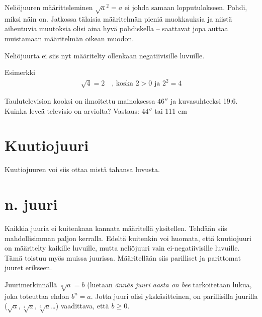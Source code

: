 Neliöjuuren määritteleminen $\sqrt{a}^2=a$ ei johda samaan lopputulokseen. Pohdi, miksi näin on.
Jatkossa tälaisia määritelmän pieniä muokkauksia ja niistä aiheutuvia muutoksia olisi aina hyvä pohdiskella -- saattavat jopa auttaa muistamaan määritelmän oikean muodon.


Neliöjuurta ei siis nyt määritelty ollenkaan negatiivisille luvuille.


Esimerkki
\begin{align*}
\sqrt{4} = 2 \quad \textrm{, koska $2>0$ ja $2^2 =4$} 
\end{align*}

Taulutelevision kooksi on ilmoitettu mainoksessa $46''$ ja kuvasuhteeksi 19:6. Kuinka leveä televisio on arviolta?
Vastaus: $44''$ tai 111 cm

\section{Kuutiojuuri}

Kuutiojuuren voi siis ottaa mistä tahansa luvusta.


\section{n. juuri}
Kaikkia juuria ei kuitenkaan kannata määritellä yksitellen. Tehdään siis mahdollisimman paljon kerralla. Edeltä kuitenkin voi huomata, että kuutiojuuri on määritelty kaikille luvuille, mutta neliöjuuri vain ei-negatiivisille luvuille. Tämä toistuu myös muissa juurissa. Määritellään siis parilliset ja parittomat juuret erikseen.

Juurimerkinnällä $\sqrt[n]{a}=b$ (luetaan \emph{ännäs juuri aasta on bee} tarkoitetaan lukua, joka toteuttaa ehdon $b^n = a$. Jotta juuri olisi ykskäsitteinen, on parillisilla juurilla ($\sqrt{a}, \sqrt[4]{a}, \sqrt[6]{a}$\ldots) vaadittava, että $b\ge0$.

